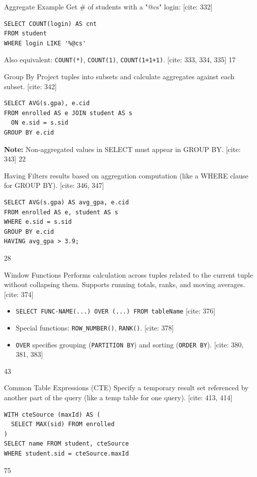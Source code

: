 \documentclass{beamer}
\begin{document}
\begin{frame}[fragile]{Aggregate Example}
    Get \# of students with a "@cs" login: [cite: 332]
    \begin{lstlisting}
SELECT COUNT(login) AS cnt
FROM student 
WHERE login LIKE '%@cs'
    \end{lstlisting}
    Also equivalent: \texttt{COUNT(*)}, \texttt{COUNT(1)}, \texttt{COUNT(1+1+1)}. [cite: 333, 334, 335]
    \vfill
    \hfill 17
\end{frame}

\begin{frame}[fragile]{Group By}
    Project tuples into subsets and calculate aggregates against each subset. [cite: 342]
    \begin{lstlisting}
SELECT AVG(s.gpa), e.cid
FROM enrolled AS e JOIN student AS s
  ON e.sid = s.sid
GROUP BY e.cid
    \end{lstlisting}
    \textbf{Note:} Non-aggregated values in SELECT must appear in GROUP BY. [cite: 343]
    \vfill
    \hfill 22
\end{frame}

\begin{frame}[fragile]{Having}
    Filters results based on aggregation computation (like a WHERE clause for GROUP BY). [cite: 346, 347]
    \begin{lstlisting}
SELECT AVG(s.gpa) AS avg_gpa, e.cid
FROM enrolled AS e, student AS s
WHERE e.sid = s.sid
GROUP BY e.cid
HAVING avg_gpa > 3.9;
    \end{lstlisting}
    \vfill
    \hfill 28
\end{frame}

\begin{frame}{Window Functions}
    Performs calculation across tuples related to the current tuple without collapsing them. Supports running totals, ranks, and moving averages. [cite: 374]
    \begin{itemize}
        \item \texttt{SELECT FUNC-NAME(...) OVER (...) FROM tableName} [cite: 376]
        \item Special functions: \texttt{ROW\_NUMBER()}, \texttt{RANK()}. [cite: 378]
        \item \texttt{OVER} specifies grouping (\texttt{PARTITION BY}) and sorting (\texttt{ORDER BY}). [cite: 380, 381, 383]
    \end{itemize}
    \vfill
    \hfill 43
\end{frame}

\begin{frame}[fragile]{Common Table Expressions (CTE)}
    Specify a temporary result set referenced by another part of the query (like a temp table for one query). [cite: 413, 414]
    \begin{lstlisting}
WITH cteSource (maxId) AS (
  SELECT MAX(sid) FROM enrolled
)
SELECT name FROM student, cteSource
WHERE student.sid = cteSource.maxId
    \end{lstlisting}
    \vfill
    \hfill 75
\end{frame}
\end{document}
